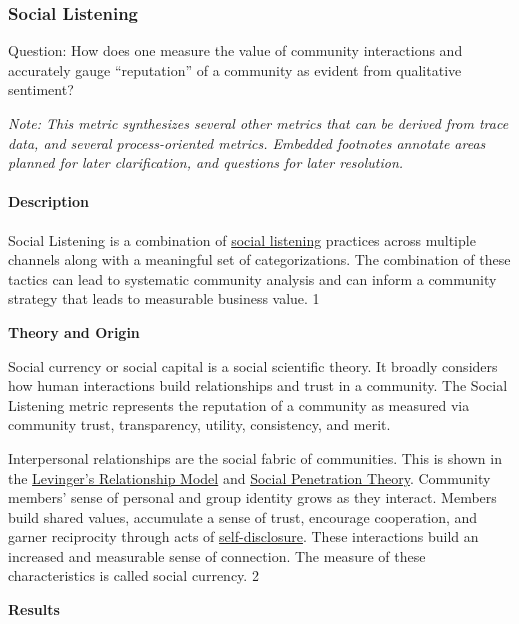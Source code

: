 \hypertarget{social-listening}{%
\subsubsection{Social Listening}\label{social-listening}}

Question: How does one measure the value of community interactions and
accurately gauge ``reputation'' of a community as evident from
qualitative sentiment?

\emph{Note: This metric synthesizes several other metrics that can be
derived from trace data, and several process-oriented metrics. Embedded
footnotes annotate areas planned for later clarification, and questions
for later resolution.}

\hypertarget{description}{%
\paragraph{Description}\label{description}}

Social Listening is a combination of
\href{https://blog.hubspot.com/service/social-listening}{social
listening} practices across multiple channels along with a meaningful
set of categorizations. The combination of these tactics can lead to
systematic community analysis and can inform a community strategy that
leads to measurable business value. 1

\textbf{Theory and Origin}

Social currency or social capital is a social scientific theory. It
broadly considers how human interactions build relationships and trust
in a community. The Social Listening metric represents the reputation of
a community as measured via community trust, transparency, utility,
consistency, and merit.

Interpersonal relationships are the social fabric of communities. This
is shown in the
\href{https://theadminzone.com/ams/levingers-stage-theory.1272/}{Levinger's
Relationship Model} and
\href{https://psycnet.apa.org/record/1973-28661-000}{Social Penetration
Theory}. Community members' sense of personal and group identity grows
as they interact. Members build shared values, accumulate a sense of
trust, encourage cooperation, and garner reciprocity through acts of
\href{https://en.wikipedia.org/wiki/Self-disclosure}{self-disclosure}.
These interactions build an increased and measurable sense of
connection. The measure of these characteristics is called social
currency. 2

\textbf{Results}

